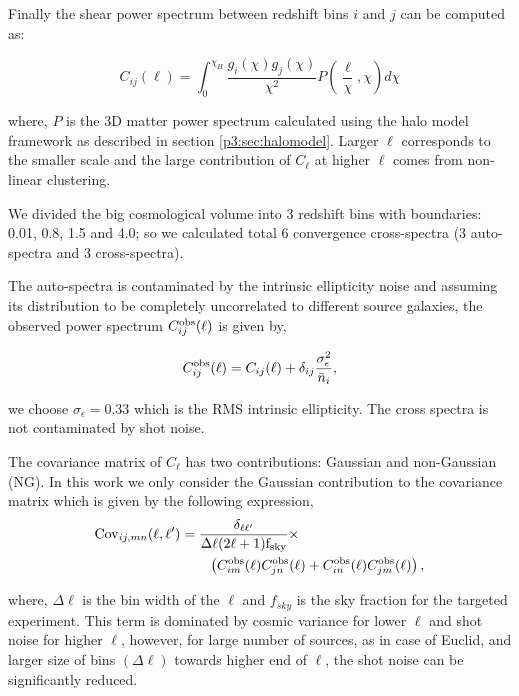 \documentclass[
  11pt,
  twoside,
  openright,
  titlepage,
  headings=optiontoheadandtoc
]{scrbook}
\begin{document}
Finally the shear power spectrum between redshift bins $i$ and $j$ can be computed as:

\begin{equation}
	C_{ij}(\ell) =  \int_0^{\chi_H} \dfrac{g_i(\chi) g_j(\chi)}{ \chi^2} P\left(\dfrac{\ell}{\chi},\chi \right)d \chi
\end{equation}

where, $P$ is the 3D matter power spectrum calculated using the halo model framework as described in section \ref{p3:sec:halomodel}. Larger $\ell$ corresponds to the smaller scale and the large contribution of $C_{\ell}$ at higher $\ell$ comes from non-linear clustering. 

We divided the big cosmological volume into 3 redshift bins with boundaries: 0.01, 0.8, 1.5 and 4.0; so we calculated total 6 convergence cross-spectra (3 auto-spectra and 3 cross-spectra).

The auto-spectra is contaminated by the intrinsic ellipticity noise and assuming its distribution to be completely uncorrelated to different source galaxies, the observed power spectrum $C_{ij}^{\rm{obs}}(\ell)$ is given by,

\begin{equation}
	C_{ij}^{\rm{obs}}(\ell) = C_{ij}(\ell) + \delta_{ij}\dfrac{\sigma_{\epsilon}^2}{\bar{n}_i},
\end{equation}

we choose $\sigma_{\epsilon}=0.33$ which is the RMS intrinsic ellipticity. The cross spectra is not contaminated by shot noise. 

The covariance matrix of $C_{\ell}$ has two contributions: Gaussian and non-Gaussian (NG). In this work we only consider the Gaussian contribution to the covariance matrix which is given by the following expression,
\begin{align}
	{\rm Cov}_{ij,mn}(\ell,\ell^{\prime})& = \dfrac{\delta_{\ell\ell^{\prime}}}
										{\Delta\ell(2\ell+1) \rm{f_{sky}}} \times  \nonumber\\
										&\qquad  \left(C_{im}^{\rm{obs}}(\ell)C_{jn}^{\rm{obs}}(\ell)+
										C_{in}^{\rm{obs}}(\ell)C_{jm}^{\rm{obs}}(\ell) \right),
\end{align}

where, $\Delta\ell$ is the bin width of the $\ell$ and $f_{sky}$ is the sky fraction for the targeted experiment. This term is dominated by cosmic variance for lower $\ell$ and shot noise for higher $\ell$, however, for large number of sources, as in case of Euclid, and larger size of bins $(\Delta \ell)$ towards higher end of $\ell$, the shot noise can be significantly reduced.
\end{document}

